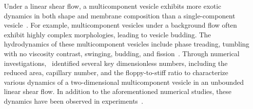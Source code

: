 \documentclass[twoside,twocolumn,9pt]{article}
\begin{document}
Under a linear shear flow, a multicomponent vesicle exhibits more exotic
dynamics in both shape and membrane composition than a single-component
vesicle~\cite{soh-tse-li-voi-low2010, Smith2007_JChemPhys,
Cox2015_Nonlinearity, liu-mar-li-vee-low2017, Tusch2018_PRF,
Gera2018_SoftMatter, ger-sal-spa2022}. For example, multicomponent
vesicles under a background flow often exhibit highly complex
morphologies, leading to vesicle budding. The hydrodynamics of these
multicomponent vesicles include phase treading, tumbling with no
viscosity contrast, swinging, budding, and
fission~\cite{soh-tse-li-voi-low2010, wan-du2008, all-ama2006,
ger-sal-spa2022, lip1992, urs-klu-phi2009}. Through numerical
investigations,~\citet{liu-mar-li-vee-low2017} identified several key
dimensionless numbers, including the reduced area, capillary number, and
the floppy-to-stiff ratio to characterize various dynamics of a
two-dimensional multicomponent vesicle in an unbounded linear shear
flow. In addition to the aforementioned numerical studies, these
dynamics have been observed in experiments~\cite{bag-sun2009,
yan-ima-tan2010, yan-ima-tan2008, dre-jah-bob-spa-gop2021}.
\end{document}
